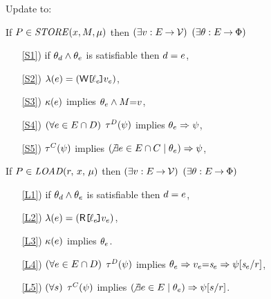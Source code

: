 \begin{definition}[$\xRecycle$/$\xIF$]
  \label{def:pomsets-if}
  Update  to:

  If $\aPS \in \sSTOREtight[\amode]{\aLoc}{\aExp}$ then
  $(\exists\aVal:\aEvs\fun\Val)$
  $(\exists\cForm:\aEvs\fun\Formulae)$
  \begin{enumerate}
  \item[\ref{S1})] if $\cForm_\bEv\land\cForm_\aEv$ is satisfiable then $\bEv=\aEv$,
  \item[\ref{S2})] $\labelingAct(\aEv) = \DWREFP{\cVal_\aEv}{\aVal_\aEv}$,
  \item[\ref{S3})] $\labelingForm(\aEv)$ implies $\cForm_\aEv \land \aExp{=}\aVal$,
  \item[\ref{S4})] $(\forall\aEv\in\aEvs\cap\bEvs)$
    $\aTr{\bEvs}{\bForm}$ implies $\cForm_\aEv \limplies \bForm\noSUB{[\aExp/\aLoc]}$,
  \item[\ref{S5})] 
    $\aTr{\cEvs}{\bForm}$ implies $(\!\not\exists\aEv\in\aEvs\cap\cEvs \suchthat \cForm_\aEv) \limplies \bForm\noSUB{[\aExp/\aLoc]}$,
  \end{enumerate}

  If $\aPS \in \sLOAD[\amode]{\aReg}{\aLoc}$ then
  $(\exists\aVal:\aEvs\fun\Val)$
  $(\exists\cForm:\aEvs\fun\Formulae)$
  \begin{enumerate}
  \item[\ref{L1})] 
    if $\cForm_\bEv\land\cForm_\aEv$ is satisfiable then $\bEv=\aEv$,
  \item[\ref{L2})] 
    $\labelingAct(\aEv) = \DRREFP{\cVal_\aEv}{\aVal_\aEv}$,
  \item[\ref{L3})] 
    $\labelingForm(\aEv)$ implies $\cForm_\aEv$.
  \item[\ref{L4})] 
    $(\forall\aEv\in\aEvs\cap\bEvs)$
    $\aTr{\bEvs}{\bForm}$ implies $\cForm_\aEv \limplies \aVal_\aEv{=}\uReg{\aEv}\limplies\bForm[\uReg{\aEv}/\aReg]$, 
  \item[\ref{L5})]
    $(\forall\bReg)$
    $\aTr{\cEvs}{\bForm}$ implies $(\!\not\exists\aEv\in\aEvs \suchthat \cForm_\aEv) \limplies \bForm[\bReg/\aReg]$. 
  \end{enumerate}  
\end{definition}

